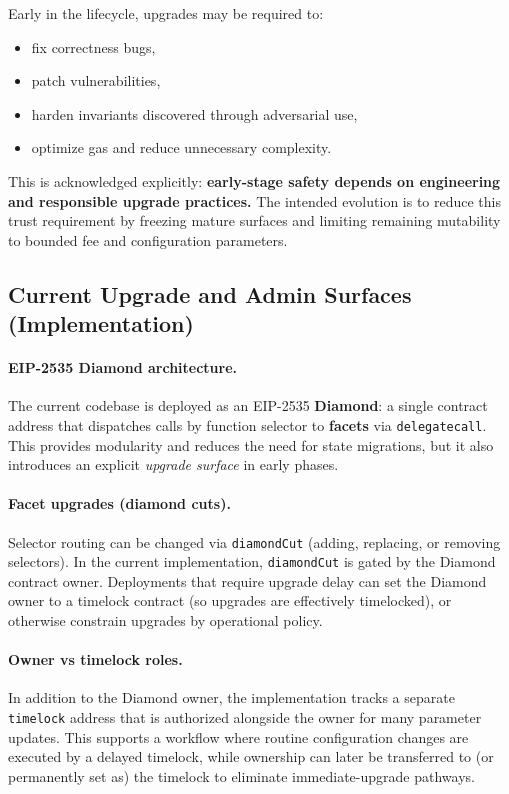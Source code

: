 \documentclass[version=preprint]{iacrcc}
\begin{document}
Early in the lifecycle, upgrades may be required to:
\begin{itemize}
  \item fix correctness bugs,
  \item patch vulnerabilities,
  \item harden invariants discovered through adversarial use,
  \item optimize gas and reduce unnecessary complexity.
\end{itemize}

This is acknowledged explicitly: \textbf{early-stage safety depends on engineering and responsible upgrade practices.}
The intended evolution is to reduce this trust requirement by freezing mature surfaces and limiting remaining mutability to bounded fee and configuration parameters.

\subsection{Current Upgrade and Admin Surfaces (Implementation)}

\paragraph{EIP-2535 Diamond architecture.}
The current codebase is deployed as an EIP-2535 \textbf{Diamond}: a single contract address that dispatches calls by function selector to \textbf{facets} via \texttt{delegatecall}. This provides modularity and reduces the need for state migrations, but it also introduces an explicit \emph{upgrade surface} in early phases.

\paragraph{Facet upgrades (diamond cuts).}
Selector routing can be changed via \texttt{diamondCut} (adding, replacing, or removing selectors). In the current implementation, \texttt{diamondCut} is gated by the Diamond contract owner. Deployments that require upgrade delay can set the Diamond owner to a timelock contract (so upgrades are effectively timelocked), or otherwise constrain upgrades by operational policy.

\paragraph{Owner vs timelock roles.}
In addition to the Diamond owner, the implementation tracks a separate \texttt{timelock} address that is authorized alongside the owner for many parameter updates. This supports a workflow where routine configuration changes are executed by a delayed timelock, while ownership can later be transferred to (or permanently set as) the timelock to eliminate immediate-upgrade pathways.
\end{document}
